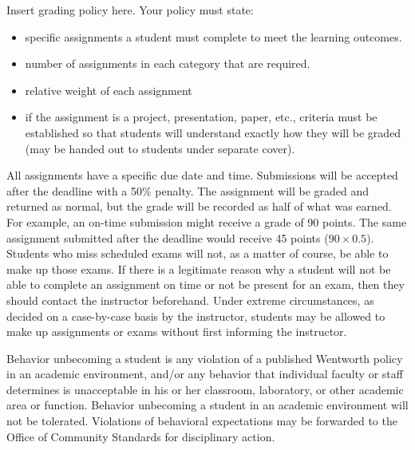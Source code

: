 \documentclass{wit_syllabus}
\begin{document}
Insert grading policy here.  Your policy must state:
\begin{itemize}
\item specific assignments a student must complete to meet the learning outcomes.
\item number of assignments in each category that are required.
\item relative weight of each assignment
\item if the assignment is a project, presentation, paper, etc., criteria must be established so that students will understand exactly how they will be graded (may be handed out to students under separate cover).
\end{itemize}

\SyllabusGradingSystem

\SyllabusDropAdd


All assignments have a specific due date and time.  
Submissions will be accepted after the deadline with a 50\% penalty.  
The assignment will be graded and returned as normal, but the grade will be recorded as half of what was earned.  
For example, an on-time submission might receive a grade of 90 points.  
The same assignment submitted after the deadline would receive 45 points ($90 \times 0.5$).  
\\

Students who miss scheduled exams will not, as a matter of course, be able to make up those exams.  
If there is a legitimate reason why a student will not be able to complete an assignment on time or not be present for an exam, then they should contact the instructor beforehand.  
Under extreme circumstances, as decided on a case-by-case basis by the instructor, students may be allowed to make up assignments or exams without first informing the instructor.

\SyllabusAcademicSupport

\SyllabusAcademicHonesty


Behavior unbecoming a student is any violation of a published Wentworth policy in an academic environment, and/or any behavior that individual faculty or staff determines is unacceptable in his or her classroom, laboratory, or other academic area or function. 
Behavior unbecoming a student in an academic environment will not be tolerated. 
Violations of behavioral expectations may be forwarded to the Office of Community Standards for disciplinary action.
\\
\end{document}
